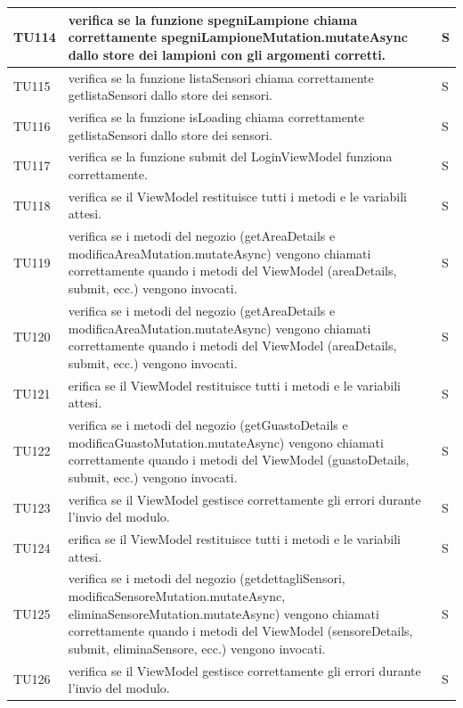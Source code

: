 \documentclass[12pt]{article}
\begin{document}
\begin{xltabular}{\linewidth}{|>{\hsize}X|X|>{\hsize}X|}
	TU114 & verifica se la funzione spegniLampione chiama correttamente spegniLampioneMutation.mutateAsync dallo store dei lampioni con gli argomenti corretti. & S \\ \hline
	TU115 & verifica se la funzione listaSensori chiama correttamente getlistaSensori dallo store dei sensori.  & S \\ \hline
	TU116 & verifica se la funzione isLoading chiama correttamente getlistaSensori dallo store dei sensori.  & S \\ \hline
	TU117 & verifica se la funzione submit del LoginViewModel funziona correttamente. & S \\ \hline
	TU118 & verifica se il ViewModel restituisce tutti i metodi e le variabili attesi.  & S \\ \hline
	TU119 & verifica se i metodi del negozio (getAreaDetails e modificaAreaMutation.mutateAsync) vengono chiamati correttamente quando i metodi del ViewModel (areaDetails, submit, ecc.) vengono invocati.  & S \\ \hline
	TU120 & verifica se i metodi del negozio (getAreaDetails e modificaAreaMutation.mutateAsync) vengono chiamati correttamente quando i metodi del ViewModel (areaDetails, submit, ecc.) vengono invocati.  & S \\ \hline
	TU121 & erifica se il ViewModel restituisce tutti i metodi e le variabili attesi.  & S \\ \hline
	TU122 & verifica se i metodi del negozio (getGuastoDetails e modificaGuastoMutation.mutateAsync) vengono chiamati correttamente quando i metodi del ViewModel (guastoDetails, submit, ecc.) vengono invocati.  & S \\ \hline
	TU123 & verifica se il ViewModel gestisce correttamente gli errori durante l'invio del modulo. & S \\ \hline
	TU124 & erifica se il ViewModel restituisce tutti i metodi e le variabili attesi.  & S \\ \hline
	TU125 & verifica se i metodi del negozio (getdettagliSensori, modificaSensoreMutation.mutateAsync, eliminaSensoreMutation.mutateAsync) vengono chiamati correttamente quando i metodi del ViewModel (sensoreDetails, submit, eliminaSensore, ecc.) vengono invocati. & S \\ \hline
	TU126 & verifica se il ViewModel gestisce correttamente gli errori durante l'invio del modulo. & S \\ \hline


\end{xltabular}
\end{document}
